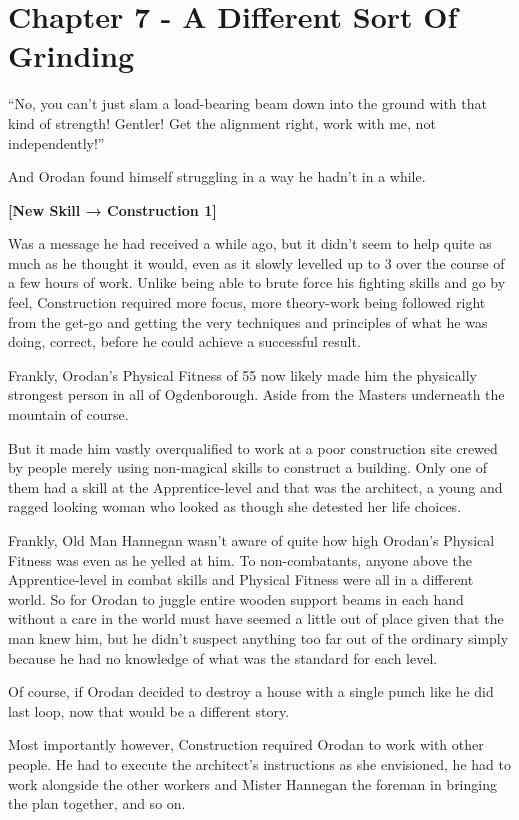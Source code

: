 \documentclass[a4paper,10pt]{book}
\begin{document}
\section*{Chapter 7 - A Different Sort Of Grinding}
%
\par
“No, you can’t just slam a load-bearing beam down into the ground with that kind of strength! Gentler! Get the alignment right, work with me, not independently!”\par
And Orodan found himself struggling in a way he hadn’t in a while.\par
\textbf{[New Skill → Construction 1]}\par
Was a message he had received a while ago, but it didn’t seem to help quite as much as he thought it would, even as it slowly levelled up to 3 over the course of a few hours of work. Unlike being able to brute force his fighting skills and go by feel, Construction required more focus, more theory-work being followed right from the get-go and getting the very techniques and principles of what he was doing, correct, before he could achieve a successful result.\par
Frankly, Orodan’s Physical Fitness of 55 now likely made him the physically strongest person in all of Ogdenborough. Aside from the Masters underneath the mountain of course.\par
But it made him vastly overqualified to work at a poor construction site crewed by people merely using non-magical skills to construct a building. Only one of them had a skill at the Apprentice-level and that was the architect, a young and ragged looking woman who looked as though she detested her life choices.\par
Frankly, Old Man Hannegan wasn’t aware of quite how high Orodan’s Physical Fitness was even as he yelled at him. To non-combatants, anyone above the Apprentice-level in combat skills and Physical Fitness were all in a different world. So for Orodan to juggle entire wooden support beams in each hand without a care in the world must have seemed a little out of place given that the man knew him, but he didn’t suspect anything too far out of the ordinary simply because he had no knowledge of what was the standard for each level.\par
Of course, if Orodan decided to destroy a house with a single punch like he did last loop, now that would be a different story.\par
Most importantly however, Construction required Orodan to work with other people. He had to execute the architect’s instructions as she envisioned, he had to work alongside the other workers and Mister Hannegan the foreman in bringing the plan together, and so on.\par
\end{document}
